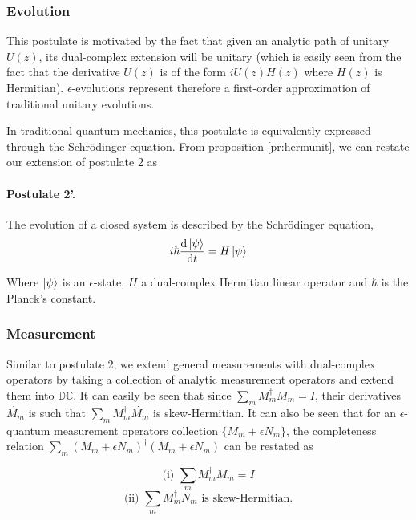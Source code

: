 \documentclass{article}
\newcommand{\DC}{\mathbb{DC}}
\newcommand{\e}{\epsilon}
\newcommand\dstate[2]{\frac{\mathrm{d}\ket{#1}}{\mathrm{d}#2}}
\begin{document}
\subsubsection*{Evolution}

This postulate is motivated by the fact that given an analytic path of unitary $U(z)$, its dual-complex extension will be unitary (which is easily seen from the fact that the derivative $U(z)$ is of the form $iU(z)H(z)$ where $H(z)$ is Hermitian). $\e$-evolutions represent therefore a first-order approximation of traditional unitary evolutions.

In traditional quantum mechanics, this postulate is equivalently expressed through the Schrödinger equation. From proposition \ref{pr:hermunit}, we can restate our extension of postulate 2 as

\paragraph{Postulate 2'.} The evolution of a closed system is described by the Schrödinger equation,
\begin{equation}
 i\hbar \dstate \psi t = H\ket\psi
\end{equation}

Where $\ket\psi$ is an $\e$-state, $H$ a dual-complex Hermitian linear operator and $\hbar$ is the Planck's constant.

\subsubsection*{Measurement}

Similar to postulate 2, we extend general measurements with dual-complex operators by taking a collection of analytic measurement operators and extend them into $\DC$. It can easily be seen that since $\sum_m M_m^\dagger M_m = I$, their derivatives $\dot{M_m}$ is such that $\sum_m M_m^\dagger \dot{M_m}$ is skew-Hermitian. It can also be seen that for an $\e$-quantum measurement operators collection $\{M_m + \e N_m\}$, the completeness relation $\sum_m (M_m + \e N_m)^\dagger (M_m + \e N_m)$ can be restated as

\begin{multicols}{2}
\noindent \begin{equation}
 \text{(i) } \sum_m M_m^\dagger M_m = I
\end{equation}
\columnbreak
\noindent \begin{equation}
 \text{(ii) } \sum_m M_m^\dagger N_m \text{ is skew-Hermitian.}
\end{equation}
\end{multicols}
\end{document}
